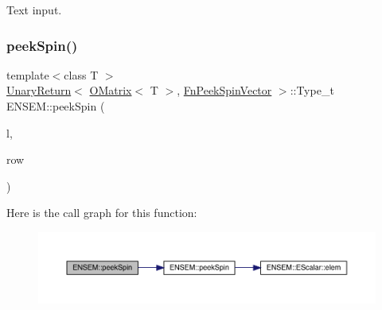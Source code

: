 Text input. 

\mbox{\label{group__obsmatrix_ga4d21a5274ec8135eea719a150bed1f7a}} 
\subsubsection{\texorpdfstring{peekSpin()}{peekSpin()}\hspace{0.1cm}{\footnotesize\ttfamily [1/2]}}
{\footnotesize\ttfamily template$<$class T $>$ \\
\mbox{\hyperlink{structENSEM_1_1UnaryReturn}{Unary\+Return}}$<$ \mbox{\hyperlink{classENSEM_1_1OMatrix}{O\+Matrix}}$<$ T $>$, \mbox{\hyperlink{structENSEM_1_1FnPeekSpinVector}{Fn\+Peek\+Spin\+Vector}} $>$\+::Type\+\_\+t E\+N\+S\+E\+M\+::peek\+Spin (\begin{DoxyParamCaption}\item[{const \mbox{\hyperlink{classENSEM_1_1OMatrix}{O\+Matrix}}$<$ T $>$ \&}]{l,  }\item[{int}]{row }\end{DoxyParamCaption})\hspace{0.3cm}{\ttfamily [inline]}}

Here is the call graph for this function\+:\nopagebreak
\begin{figure}[H]
\begin{center}
\leavevmode
\includegraphics[width=350pt]{d8/d55/group__obsmatrix_ga4d21a5274ec8135eea719a150bed1f7a_cgraph}
\end{center}
\end{figure}
\mbox{\label{group__obsmatrix_ga5d47056fa4fb3fad4e48957e55c3cdec}} 
